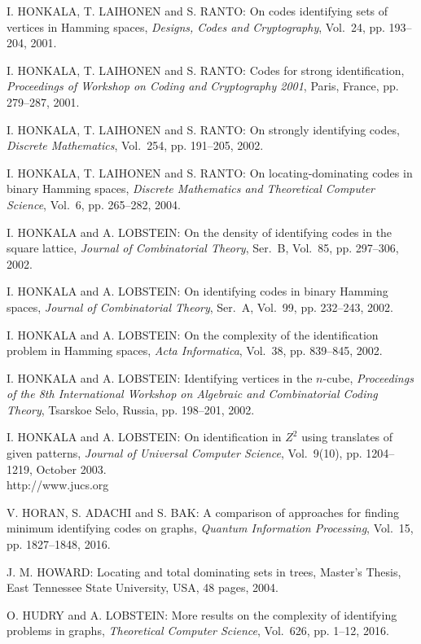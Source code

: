 \begin{thebibliography}{999}
I. HONKALA, T. LAIHONEN and S. RANTO: On codes identifying sets of vertices in Hamming spaces, {\it Designs, Codes and Cryptography}, Vol.~24, pp. 193--204, 2001.

I. HONKALA, T. LAIHONEN and S. RANTO: Codes for strong identification, {\it Proceedings of Workshop on Coding and Cryptography 2001}, Paris, France, pp. 279--287, 2001.

I. HONKALA, T. LAIHONEN and S. RANTO: On strongly identifying codes, {\it Discrete Mathematics}, Vol.~254, pp. 191--205, 2002. 

I. HONKALA, T. LAIHONEN and S. RANTO: On locating-dominating codes in binary Hamming spaces, {\it Discrete Mathematics and Theoretical Computer Science}, Vol.~6, pp. 265--282, 2004.

I. HONKALA and A. LOBSTEIN: On the density of identifying codes in the square lattice, {\it Journal of Combinatorial Theory}, Ser.~B, Vol.~85, pp. 297--306, 2002.

I. HONKALA and A. LOBSTEIN: On identifying codes in binary Hamming spaces, {\it Journal of Combinatorial Theory}, Ser.~A, Vol.~99, pp. 232--243, 2002.

I. HONKALA and A. LOBSTEIN: On the complexity of the identification problem in Hamming spaces, {\it Acta Informatica}, Vol.~38, pp. 839--845, 2002.

I. HONKALA and A. LOBSTEIN: Identifying vertices in the $n$-cube, {\it Proceedings of the 8th International Workshop on Algebraic and Combinatorial Coding Theory}, Tsarskoe Selo, Russia, pp. 198--201, 2002.

I. HONKALA and A. LOBSTEIN: On identification in $Z^2$ using translates of given patterns, {\it Journal of Universal Computer Science}, Vol.~9(10), pp. 1204--1219, October 2003.\\
http://www.jucs.org

V. HORAN, S. ADACHI and S. BAK: A comparison of approaches for finding minimum identifying codes on graphs, {\it Quantum Information Processing}, Vol.~15, pp. 1827--1848, 2016.

J. M. HOWARD: Locating and total dominating sets in trees, Master's Thesis, East Tennessee State University, USA, 48 pages, 2004.

O. HUDRY and A. LOBSTEIN: More results on the complexity of identifying problems in graphs, {\it Theoretical Computer Science}, Vol.~626, pp. 1--12, 2016.


\end{thebibliography}
